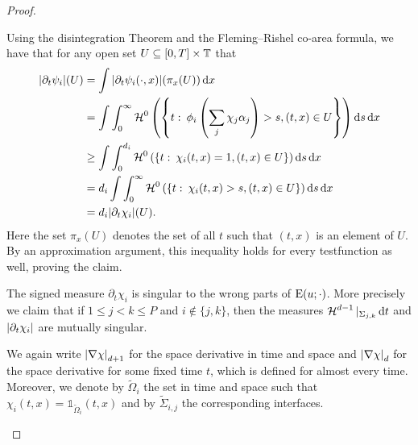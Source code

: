 \begin{proof}
\begin{description}[wide=0pt]
		Using the disintegration Theorem \cite[Thm.~3.103]{ambrosio_fusco_pallara_functions_of_bv_and_free_discontinuity_problems} and the Fleming--Rishel co-area formula, we have that for any open set $ U \subseteq [ 0 , T ] \times \operatorname{\mathbb{T}} $ that
		\begin{align*}
			\abs{
				\partial_{ t } \psi_{ i }
			} ( U ) 
			& =
			\int
				\abs{ 
					\partial_{ t } \psi_{ i } ( \cdot , x )
				} ( \pi_{ x } ( U ) ) 
			\dd{ x }
			\\
			& =
			\int
				\int_{ 0 }^{ \infty }
					\operatorname{\mathcal{H}}^{ 0 } \left(
						\left\{
							t 
							\, \colon \,
							\phi_{ i } 
							\left( \sum_{ j } \chi_{ j } \alpha_{ j } \right) > s,
							( t, x ) \in U
						\right\}
					\right)
				\dd{ s }
			\dd{ x }
			\\
			& \geq
			\int
				\int_{ 0 }^{ d_{ i } }
					\operatorname{\mathcal{H}}^{ 0 }
						\left(
							\left\{
								t 
								\, \colon \,
								\chi_{ i } ( t , x ) = 1,
								( t, x ) \in U
							\right\}
						\right)
				\dd{ s }
			\dd{ x }
			\\
			& =
			d_{ i }
			\int
				\int_{ 0 }^{ \infty }
					\operatorname{\mathcal{H}}^{ 0 } \left(
						\left\{
							t 
							\, \colon \,
							\chi_{ i } ( t , x ) > s , ( t , x ) \in U
						\right\}
					\right)
				\dd{ s }
			\dd{ x }
			\\
			& =
			d_{ i }
			\abs{ \partial_{ t } \chi_{ i } } ( U ).
		\end{align*}
		Here the set $ \pi_{ x } ( U ) $ denotes the set of all $ t $ such that $ ( t , x ) $ is an element of $ U $.
		By an approximation argument, this inequality holds for every testfunction as well, proving the claim.
		
		\item[Step 3:] The signed measure $ \partial_{ t } \chi_{ i } $ is singular to the wrong parts of $ \operatorname{E} ( u ; \cdot ) $. More precisely we claim that if $ 1 \leq j < k \leq P $ and $ i \notin \{ j , k \} $, then the measures 
		$ \operatorname{\mathcal{H}}^{ d - 1 } |_{ \Sigma_{ j , k } } \dd{ t } $ and $ \abs{ \partial_{ t } \chi_{ i } } $ are mutually singular.
		
		We again write $ \abs{ \nabla \chi }_{ d + 1 } $ for the space derivative in time and space and $ \abs{ \nabla \chi }_{ d } $ for the space derivative for some fixed time $ t $, which is defined for almost every time. Moreover, we denote by $ \tilde{ \Omega }_{ i } $ the set in time and space such that
		$ \chi_{ i } ( t , x ) = \mathds{ 1 }_{ \tilde{ \Omega }_{ i } } ( t , x ) $
		and by $ \tilde{ \Sigma }_{ i , j } $ the corresponding interfaces.
		

\end{description}
\end{proof}
